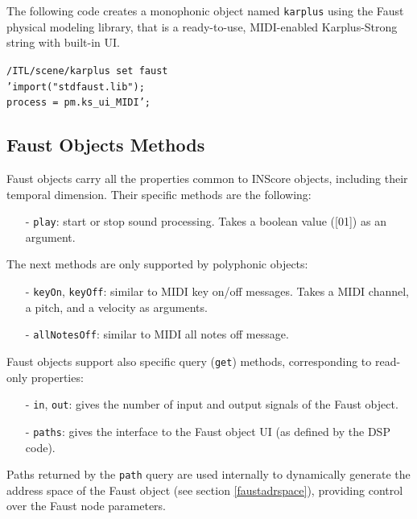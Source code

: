 \documentclass{article}
\newcommand{\ispace}	{\setlength\itemsep{0mm}}
\newcommand{\icode}[1]	{{\small \texttt{#1}}}
\newcommand{\code}[1]	{\vspace{-1em}\begin{center}\colorbox{mygrey}{\begin{minipage}[t]{0.98\columnwidth} {\scriptsize \texttt{#1}}\end{minipage}}\end{center}}
\begin{document}
The following code creates a monophonic object named \icode{karplus} using the Faust physical modeling library, that is a ready-to-use, MIDI-enabled Karplus-Strong string with built-in UI.
\code{/ITL/scene/karplus set faust \\
\hspace*{10mm} 'import("stdfaust.lib"); \\
\hspace*{11mm} process = pm.ks\_ui\_MIDI';}


\subsection{Faust Objects Methods}

Faust objects carry all the properties common to INScore objects, including their temporal dimension. 
Their specific methods are the following:
\begin{itemize}
\item[-] \icode{play}: start or stop sound processing. Takes a boolean value ([01]) as an argument.
\end{itemize}

The next methods are only supported by polyphonic objects:
\begin{itemize}
\ispace
\item[-] \icode{keyOn}, \icode{keyOff}: similar to MIDI key on/off messages. Takes a MIDI channel, a pitch, and a velocity as arguments.
\item[-] \icode{allNotesOff}: similar to MIDI all notes off message. 
\end{itemize}

Faust objects support also specific query (\icode{get}) methods, corresponding to read-only properties:
\begin{itemize}
\ispace
\item[-] \icode{in}, \icode{out}: gives the number of input and output signals of the Faust object.
\item[-] \icode{paths}: gives the interface to the Faust object UI (as defined by the DSP code).
\end{itemize}

Paths returned by the \icode{path} query are used internally to dynamically generate the address space of the Faust object (see section \ref{faustadrspace}), providing control over the Faust node parameters.

\end{document}
